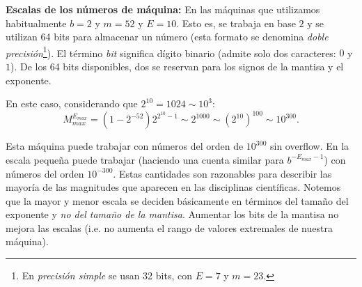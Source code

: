 \begin{tcolorbox}{\bf Escalas de los números de máquina:}
 En las máquinas que utilizamos habitualmente $b=2$ y $m=52$ y $E=10$. Esto es, se trabaja en base $2$ y se utilizan 64 bits para almacenar un número (esta formato se denomina \emph{doble precisión}\footnote{En \emph{precisión simple} se usan 32 bits, con $E=7$ y $m=23$.}). El término \emph{bit} significa dígito binario (admite solo dos caracteres: $0$ y $1$). De los 64 bits disponibles, dos se reservan para los signos de la mantisa y el exponente.

 En este caso, considerando que $2^{10}=1024\sim 10^3$:
$$M_{max}^{E_{max}}=(1-2^{-52})2^{2^{10}-1}\sim 2^{1000}\sim (2^{10})^{100}\sim 10^{300}.$$

Esta máquina puede trabajar con números del orden de $10^{300}$ sin overflow. En la escala pequeña puede trabajar (haciendo una cuenta similar para $b^{-E_{max}-1}$) con números del orden $10^{-300}$. Estas cantidades son razonables para describir las mayoría de las magnitudes que aparecen en las disciplinas científicas.
Notemos que la mayor y menor escala se deciden básicamente en términos del tamaño del exponente y \emph{no del tamaño de la mantisa}. Aumentar los bits de la mantisa no mejora las escalas (i.e. no aumenta el rango de valores extremales de nuestra máquina).
\end{tcolorbox}

